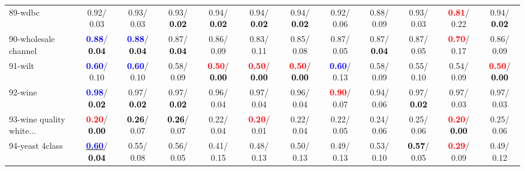 \begin{table}[h]
\begin{center}
{\begin{tabular}{lc|c|c|c|c|c|c|c|c|c|c}
89-wdbc &   0.92/  0.03 &   0.93/  0.03 &   0.93/\textcolor{black}{\textbf{  0.02}} &   0.94/\textcolor{black}{\textbf{  0.02}} &   0.94/\textcolor{black}{\textbf{  0.02}} &   0.94/\textcolor{black}{\textbf{  0.02}} &   0.92/  0.06 &   0.88/  0.09 &   0.93/  0.03 & \textcolor{red}{\textbf{  0.81}}/  0.22 &   0.94/\textcolor{black}{\textbf{  0.02}} \\
90-wholesale channel & \textcolor{blue}{\textbf{  0.88}}/\textcolor{black}{\textbf{  0.04}} & \textcolor{blue}{\textbf{  0.88}}/\textcolor{black}{\textbf{  0.04}} &   0.87/\textcolor{black}{\textbf{  0.04}} &   0.86/  0.09 &   0.83/  0.11 &   0.85/  0.08 &   0.87/  0.05 &   0.87/\textcolor{black}{\textbf{  0.04}} &   0.87/  0.05 & \textcolor{red}{\textbf{  0.70}}/  0.17 &   0.86/  0.09 \\
91-wilt & \textcolor{blue}{\textbf{  0.60}}/  0.10 & \textcolor{blue}{\textbf{  0.60}}/  0.10 &   0.58/  0.09 & \textcolor{red}{\textbf{  0.50}}/\textcolor{black}{\textbf{  0.00}} & \textcolor{red}{\textbf{  0.50}}/\textcolor{black}{\textbf{  0.00}} & \textcolor{red}{\textbf{  0.50}}/\textcolor{black}{\textbf{  0.00}} & \textcolor{blue}{\textbf{  0.60}}/  0.13 &   0.58/  0.09 &   0.55/  0.10 &   0.54/  0.09 & \textcolor{red}{\textbf{  0.50}}/\textcolor{black}{\textbf{  0.00}} \\
92-wine & \textcolor{blue}{\textbf{  0.98}}/\textcolor{black}{\textbf{  0.02}} &   0.97/\textcolor{black}{\textbf{  0.02}} &   0.97/\textcolor{black}{\textbf{  0.02}} &   0.96/  0.04 &   0.97/  0.04 &   0.96/  0.04 & \textcolor{red}{\textbf{  0.90}}/  0.07 &   0.94/  0.06 &   0.97/\textcolor{black}{\textbf{  0.02}} &   0.97/  0.03 &   0.97/  0.03 \\ \hline
93-wine quality white... & \textcolor{red}{\textbf{  0.20}}/\textcolor{black}{\textbf{  0.00}} & \textcolor{black}{\textbf{  0.26}}/  0.07 & \textcolor{black}{\textbf{  0.26}}/  0.07 &   0.22/  0.04 & \textcolor{red}{\textbf{  0.20}}/  0.01 &   0.22/  0.04 &   0.22/  0.05 &   0.24/  0.06 &   0.25/  0.06 & \textcolor{red}{\textbf{  0.20}}/\textcolor{black}{\textbf{  0.00}} &   0.25/  0.06 \\
94-yeast 4class & \underline{\textcolor{blue}{\textbf{  0.60}}}/\textcolor{black}{\textbf{  0.04}} &   0.55/  0.08 &   0.56/  0.05 &   0.41/  0.15 &   0.48/  0.13 &   0.50/  0.13 &   0.49/  0.13 &   0.53/  0.10 & \textcolor{black}{\textbf{  0.57}}/  0.05 & \textcolor{red}{\textbf{  0.29}}/  0.09 &   0.49/  0.12 \\\end{tabular}}\label{stratsBalAcc2aVFDT}
\end{center}
\end{table}
